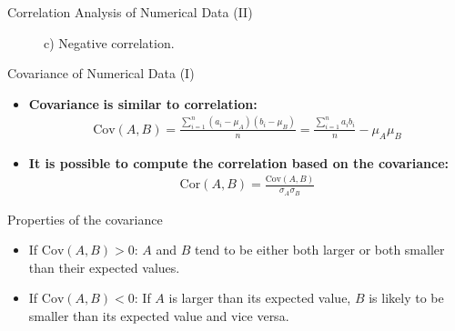 \begin{frame}{Correlation Analysis of Numerical Data (II)}
\begin{itemize}
\begin{figure}[H]
			      \begin{minipage}{0.32\textwidth}
				      \centering
				      \caption{c) Negative correlation.}
			      \end{minipage}\hfill
		      \end{figure}
	\end{itemize}
\end{frame}

\begin{frame}{Covariance of Numerical Data (I)}
	\begin{itemize}
		\item \textbf{\color{airforceblue}Covariance} \textbf{is similar to
			      correlation:}
		      \begin{align*}
			      \text{Cov}(A, B) =
			      \frac{\sum_{i=1}^{n}(a_i-\mu_{A})(b_i-\mu_{B})}{n} =
			      \frac{\sum_{i=1}^{n}a_ib_i}{n}-\mu_{A}\mu_{B}
		      \end{align*}
		\item \textbf{It is possible to compute the correlation based on the
			      covariance:}
		      \begin{align*}
			      \text{Cor}(A, B) = \frac{\text{Cov}(A,
				      B)}{\sigma_{A}\sigma_{B}}
		      \end{align*}
	\end{itemize}
	\begin{block}{Properties of the covariance}
		\begin{itemize}
			\item If $\text{Cov}(A, B) > 0$: $A$ and $B$ tend to be either both
			      larger or both smaller than their expected values.
			\item If $\text{Cov}(A, B) < 0$: If $A$ is larger than its expected
			      value, $B$ is likely to be smaller than its expected value and vice
			      versa.
		\end{itemize}
	\end{block}
\end{frame}

